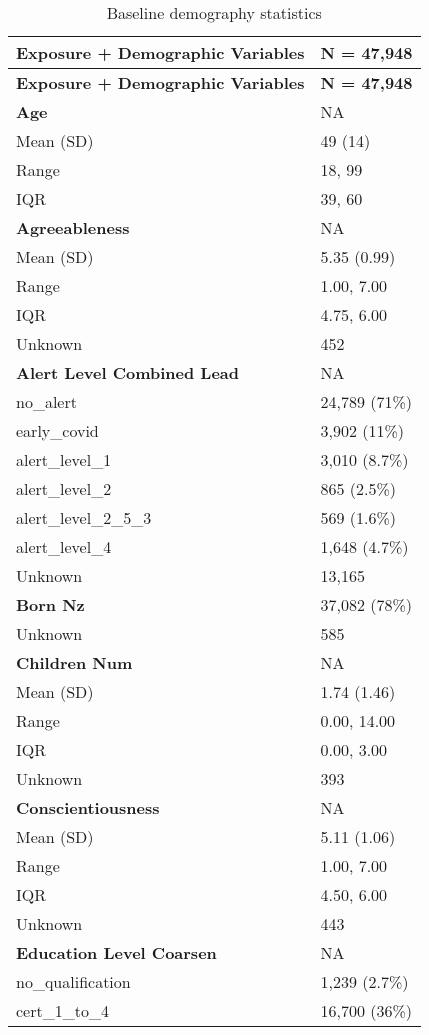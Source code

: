 \documentclass[
  singlecolumn]{article}
\begin{document}
\begin{longtable}[]{@{}ll@{}}
\caption{Baseline demography
statistics}\label{tbl-table-demography}\tabularnewline
\toprule\noalign{}
\textbf{Exposure + Demographic Variables} & \textbf{N = 47,948} \\
\midrule\noalign{}
\endfirsthead
\toprule\noalign{}
\textbf{Exposure + Demographic Variables} & \textbf{N = 47,948} \\
\midrule\noalign{}
\endhead
\bottomrule\noalign{}
\endlastfoot
\textbf{Age} & NA \\
Mean (SD) & 49 (14) \\
Range & 18, 99 \\
IQR & 39, 60 \\
\textbf{Agreeableness} & NA \\
Mean (SD) & 5.35 (0.99) \\
Range & 1.00, 7.00 \\
IQR & 4.75, 6.00 \\
Unknown & 452 \\
\textbf{Alert Level Combined Lead} & NA \\
no\_alert & 24,789 (71\%) \\
early\_covid & 3,902 (11\%) \\
alert\_level\_1 & 3,010 (8.7\%) \\
alert\_level\_2 & 865 (2.5\%) \\
alert\_level\_2\_5\_3 & 569 (1.6\%) \\
alert\_level\_4 & 1,648 (4.7\%) \\
Unknown & 13,165 \\
\textbf{Born Nz} & 37,082 (78\%) \\
Unknown & 585 \\
\textbf{Children Num} & NA \\
Mean (SD) & 1.74 (1.46) \\
Range & 0.00, 14.00 \\
IQR & 0.00, 3.00 \\
Unknown & 393 \\
\textbf{Conscientiousness} & NA \\
Mean (SD) & 5.11 (1.06) \\
Range & 1.00, 7.00 \\
IQR & 4.50, 6.00 \\
Unknown & 443 \\
\textbf{Education Level Coarsen} & NA \\
no\_qualification & 1,239 (2.7\%) \\
cert\_1\_to\_4 & 16,700 (36\%) \\

\end{longtable}
\end{document}
